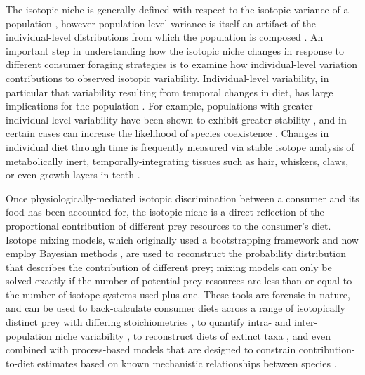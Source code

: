 \documentclass{article}
\begin{document}
The isotopic niche is generally defined with respect to the isotopic variance of a population \citep{Araujo:2007iua,Araujo:2009p2286,Fink:2012eg}, however population-level variance is itself an artifact of the individual-level distributions from which the population is composed \citep{Bolnick:2007p1253,Araujo:2011gm}.
An important step in understanding how the isotopic niche changes in response to different consumer foraging strategies is to examine how individual-level variation contributions to observed isotopic variability.
Individual-level variability, in particular that variability resulting from temporal changes in diet, has large implications for the population \citep{Kondoh:2003p1625,Kondoh:2006p1622,Schreiber:2011wx}.
For example, populations with greater individual-level variability have been shown to exhibit greater stability \citep{Bolnick:2011gj}, and in certain cases can increase the likelihood of species coexistence \citep{Schreiber:2011wx}.
Changes in individual diet through time is frequently measured via stable isotope analysis of metabolically inert, temporally-integrating tissues such as hair, whiskers, claws, or even growth layers in teeth \citep{Koch:1995vj,Matthews:2004hw,Sponheimer:2006fj,Post:2008ki,Newsome:2009tn,Yeakel:2009hz,Hopkins:2015ip}.


Once physiologically-mediated isotopic discrimination between a consumer and its food has been accounted for, the isotopic niche is a direct reflection of the proportional contribution of different prey resources to the consumer's diet.
Isotope mixing models, which originally used a bootstrapping framework \citep{Phillips:2003kq,Phillips:2005p1007} and now employ Bayesian methods \citep{Moore:2008kg,Parnell:2010ub,Hopkins:2012dza,Parnell:2012wv}, are used to reconstruct the probability distribution that describes the contribution of different prey; mixing models can only be solved exactly if the number of potential prey resources are less than or equal to the number of isotope systems used plus one.
These tools are forensic in nature, and can be used to back-calculate consumer diets across a range of isotopically distinct prey with differing stoichiometries \citep{Hopkins:2015ip}, to quantify intra- and inter-population niche variability \citep{Semmens:2009uq}, to reconstruct diets of extinct taxa \citep{Yeakel:2012uc}, and even combined with process-based models that are designed to constrain contribution-to-diet estimates based on known mechanistic relationships between species \citep{Ogle:2014jg}.
\end{document}
